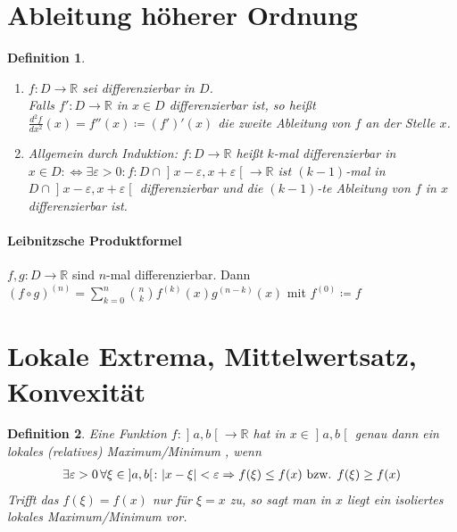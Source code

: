 \documentclass[ngerman,titlepage,twoside, parskip=half*]{scrreprt}
\newcommand*{\R}{\mathbb{R}}
\newcommand*{\perdef}{:\Leftrightarrow}
\theoremstyle{break}
\newtheorem{definition}{Definition}[chapter]
\theoremstyle{nonumberbreak}
\DeclarePairedDelimiter{\abs}{\lvert}{\rvert}
\newcommand*{\bsofint}[1]{\mathopen{]}#1\mathclose{[}} %
\begin{document}
\section{Ableitung höherer Ordnung}
\begin{definition}
  \begin{enumerate}[(1)]
    \item $f\colon D\rightarrow\R$ sei differenzierbar in $D$.\\
      Falls $f'\colon D\rightarrow\R$ in $x\in D$ differenzierbar ist, so
      heißt $\frac{d^2 f}{dx^2}(x)=f''(x)\coloneqq(f')'(x)$ die zweite 
      Ableitung von $f$ an der Stelle $x$.
    \item Allgemein durch Induktion: $f\colon D\rightarrow\R$ heißt $k$-mal
      differenzierbar in $x\in D\perdef \exists \varepsilon>0
      \colon f\colon D\cap \bsofint{x-\varepsilon,x+\varepsilon}\rightarrow\R$ ist $(k-1)$-mal
      in $D\cap\bsofint{x-\varepsilon,x+\varepsilon}$ differenzierbar und die
      $(k-1)$-te Ableitung von $f$ in $x$ differenzierbar ist.
  \end{enumerate}
\end{definition}

\paragraph{Leibnitzsche Produktformel}
$f,g\colon D\rightarrow\R$ sind $n$-mal differenzierbar. Dann $(f\circ g)^{(n)}
=\sum_{k=0}^n \binom{n}{k}f^{(k)}(x)g^{(n-k)}(x)$ mit $f^{(0)}\coloneqq f$

\section{Lokale Extrema, Mittelwertsatz, Konvexität}
\begin{definition}
  Eine Funktion $f\colon\bsofint{a,b}\rightarrow\R$ hat in $x\in \bsofint{a,b}$ genau dann
  ein \emph{lokales (relatives) Maximum/Minimum
  },
  wenn
  \begin{gather*}\exists \varepsilon>0\,\forall\xi\in \bsofint{a,b}\colon\abs{x-\xi}<\varepsilon
  \Rightarrow f(\xi)\leq f(x) \text{ bzw. } f(\xi)\geq f(x)\end{gather*}
  Trifft das $f(\xi)=f(x)$ nur für $\xi=x$ zu, so sagt man in $x$ liegt
  ein isoliertes lokales Maximum/Minimum vor.
\end{definition}
\end{document}
